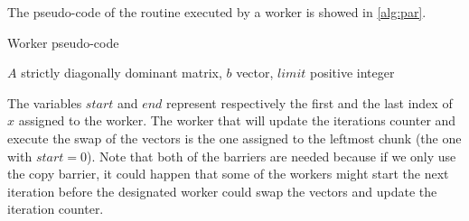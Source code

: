 \documentclass[12pt]{article}
\begin{document}
	The pseudo-code of the routine executed by a worker is showed in \ref{alg:par}.
	\begin{algorithm}[H]
		\caption{Worker pseudo-code}\label{alg:par}
		\begin{algorithmic}[1]
			\Require $A$ strictly diagonally dominant matrix, $b$ vector, $limit$ positive integer
			\EndIf
			\EndFor
			\EndFor
			\EndIf
			\EndWhile
		\end{algorithmic}
	\end{algorithm}
	\noindent The variables $start$ and $end$ represent respectively the first and the last index of $x$ assigned to the worker. The worker that will update the iterations counter and execute the swap of the vectors is the one assigned to the leftmost chunk (the one with $start = 0$). Note that both of the barriers are needed because if we only use the copy barrier, it could happen that some of the workers might start the next iteration before the designated worker could swap the vectors and update the iteration counter.
	
	
\end{document}
